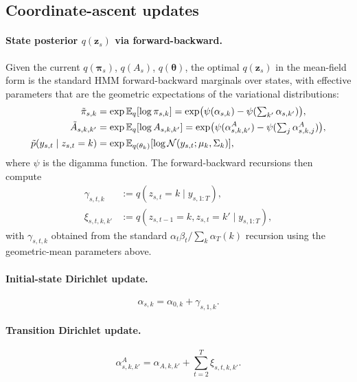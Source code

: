 \subsection*{Coordinate-ascent updates}

\paragraph{State posterior $q(\bm z_s)$ via forward-backward.} Given the current $q(\bm\pi_s)$, $q(A_s)$, $q(\bm\theta)$, the optimal $q(\bm z_s)$ in the mean-field form is the standard HMM forward-backward marginals over states, with effective parameters that are the geometric expectations of the variational distributions:
\begin{align}
\tilde\pi_{s,k} &= \exp\mathbb{E}_q[\log\pi_{s,k}] = \exp\!\big(\psi(\alpha_{s,k}) - \psi(\textstyle\sum_{k'}\alpha_{s,k'})\big),\\
\tilde A_{s,k,k'} &= \exp\mathbb{E}_q[\log A_{s,k,k'}] = \exp\!\big(\psi(\alpha^A_{s,k,k'}) - \psi(\textstyle\sum_{j}\alpha^A_{s,k,j})\big),\\
\tilde p(y_{s,t}\mid z_{s,t}=k) &= \exp\mathbb{E}_{q(\theta_k)}[\log\mathcal{N}(y_{s,t};\mu_k,\Sigma_k)],
\end{align}
where $\psi$ is the digamma function. The forward-backward recursions then compute
\begin{align}
\gamma_{s,t,k} &:= q(z_{s,t}=k\mid y_{s,1:T}),\\
\xi_{s,t,k,k'} &:= q(z_{s,t-1}=k,z_{s,t}=k'\mid y_{s,1:T}),
\end{align}
with $\gamma_{s,t,k}$ obtained from the standard $\alpha_t\beta_t/\sum_k\alpha_T(k)$ recursion using the geometric-mean parameters above.

\paragraph{Initial-state Dirichlet update.}
\begin{equation}
\alpha_{s,k} = \alpha_{0,k} + \gamma_{s,1,k}.
\end{equation}

\paragraph{Transition Dirichlet update.}
\begin{equation}
\alpha^A_{s,k,k'} = \alpha_{A,k,k'} + \sum_{t=2}^T \xi_{s,t,k,k'}.
\end{equation}

